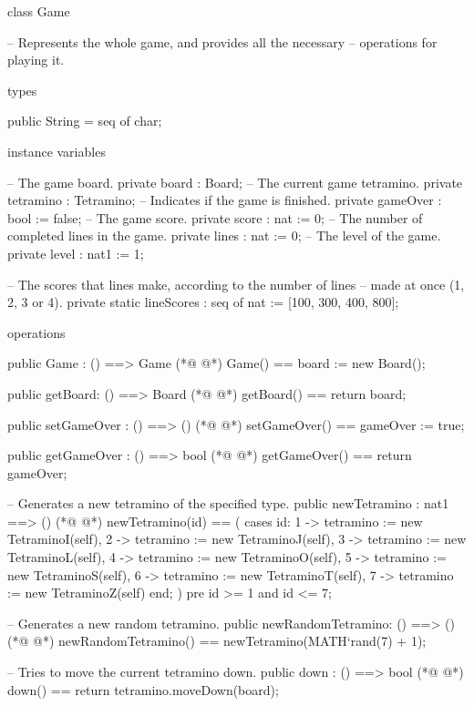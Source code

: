 \begin{vdmpp}[breaklines=true]
class Game

 -- Represents the whole game, and provides all the necessary
 -- operations for playing it.
 
 
 types
 
  public String = seq of char;


 instance variables
  
  -- The game board.
  private board  : Board;
  -- The current game tetramino.
  private tetramino : Tetramino;
  -- Indicates if the game is finished.
  private gameOver : bool   := false; 
  -- The game score. 
  private score  : nat   := 0;
  -- The number of completed lines in the game.
  private lines  : nat   := 0;
  -- The level of the game. 
  private level  : nat1   := 1;
  
  -- The scores that lines make, according to the number of lines 
  -- made at once (1, 2, 3 or 4).
  private static lineScores : seq of nat
   := [100, 300, 400, 800];
  
  
 operations
 
  public Game : () ==> Game
(*@
\label{Game:36}
@*)
  Game() ==
   board := new Board();
    
    public getBoard: () ==> Board
(*@
\label{getBoard:40}
@*)
    getBoard() ==
     return board;
        
  public setGameOver : () ==> ()
(*@
\label{setGameOver:44}
@*)
  setGameOver() ==
   gameOver := true;
   
  public getGameOver : () ==> bool
(*@
\label{getGameOver:48}
@*)
  getGameOver() ==
   return gameOver;
       
    -- Generates a new tetramino of the specified type.
  public newTetramino : nat1 ==> ()
(*@
\label{newTetramino:53}
@*)
  newTetramino(id) == (  
   cases id:
    1 -> tetramino := new TetraminoI(self),
    2 -> tetramino := new TetraminoJ(self),
    3 -> tetramino := new TetraminoL(self),
    4 -> tetramino := new TetraminoO(self),
    5 -> tetramino := new TetraminoS(self),
    6 -> tetramino := new TetraminoT(self),
    7 -> tetramino := new TetraminoZ(self)
   end;
  )
  pre id >= 1 and id <= 7;
  
    -- Generates a new random tetramino.
  public newRandomTetramino: () ==> ()
(*@
\label{newRandomTetramino:68}
@*)
  newRandomTetramino() == 
   newTetramino(MATH`rand(7) + 1);
  
    -- Tries to move the current tetramino down.
  public down : () ==> bool
(*@
\label{down:73}
@*)
  down() ==
   return tetramino.moveDown(board);
   

\end{vdmpp}
